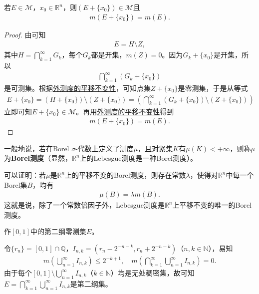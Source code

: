 \documentclass[../../main.tex]{subfiles}
\begin{document}
\begin{theorem}
若\(E \in \mathscr{M}\)，\(x_0 \in \mathbb{R}^n\)，则\((E + \{x_0\}) \in \mathscr{M}\)且
\begin{align*}
m(E + \{x_0\}) = m(E).
\end{align*}
\end{theorem}
\begin{proof}
由可知
\begin{align*}
E = H \setminus Z,
\end{align*}
其中\(H = \bigcap_{k = 1}^{\infty} G_k\)，每个\(G_k\)都是开集，\(m(Z) = 0\)。因为\(G_k + \{x_0\}\)是开集，所以
\begin{align*}
\bigcap_{k = 1}^{\infty} (G_k + \{x_0\})
\end{align*}
是可测集。根据\hyperref[theorem:外测度的平移不变性]{外测度的平移不变性}，可知点集\(Z + \{x_0\}\)是零测集，于是从等式
\begin{align*}
E + \{x_0\}= (H + \{x_0\}) \setminus (Z + \{x_0\})
= \left(\bigcap_{k = 1}^{\infty} (G_k + \{x_0\}) \setminus (Z + \{x_0\})\right)
\end{align*}
立即可知\(E + \{x_0\} \in \mathscr{M}\)。再用\hyperref[theorem:外测度的平移不变性]{外测度的平移不变性}得到
\begin{align*}
m(E + \{x_0\}) = m(E).
\end{align*}
\end{proof}
\begin{remark}
一般地说，若在Borel \(\sigma\)-代数上定义了测度\(\mu\)，且对紧集\(K\)有\(\mu(K)<+\infty\)，则称\(\mu\)为\textbf{Borel测度}（显然，\(\mathbb{R}^n\)上的Lebesgue测度是一种Borel测度）。

可以证明：若\(\mu\)是\(\mathbb{R}^n\)上的平移不变的Borel测度，则存在常数\(\lambda\)，使得对\(\mathbb{R}^n\)中每一个Borel集\(B\)，均有
\begin{align*}
\mu(B)=\lambda m(B).
\end{align*}
这就是说，除了一个常数倍因子外，Lebesgue测度是\(\mathbb{R}^n\)上平移不变的唯一的Borel测度。 
\end{remark}

\begin{example}
作\([0,1]\)中的第二纲零测集\(E\)。
\end{example}
\begin{solution}
令\(\{r_n\}=[0,1]\cap\mathbb{Q}\)，\(I_{n,k}=(r_n - 2^{-n - k},r_n + 2^{-n - k})\)（\(n,k\in\mathbb{N}\)），易知
\begin{align*}
m\left(\bigcup_{n = 1}^{\infty}I_{n,k}\right)\leqslant 2^{-k + 1},\quad
m\left(\bigcap_{k = 1}^{\infty}\bigcup_{n = 1}^{\infty}I_{n,k}\right)= 0.
\end{align*}
由于每个\([0,1]\setminus\bigcup_{n = 1}^{\infty}I_{n,k}\)（\(k\in\mathbb{N}\)）均是无处稠密集，故可知\(E = \bigcap_{k = 1}^{\infty}\bigcup_{n = 1}^{\infty}I_{n,k}\)是第二纲集。
\end{solution}
\end{document}

